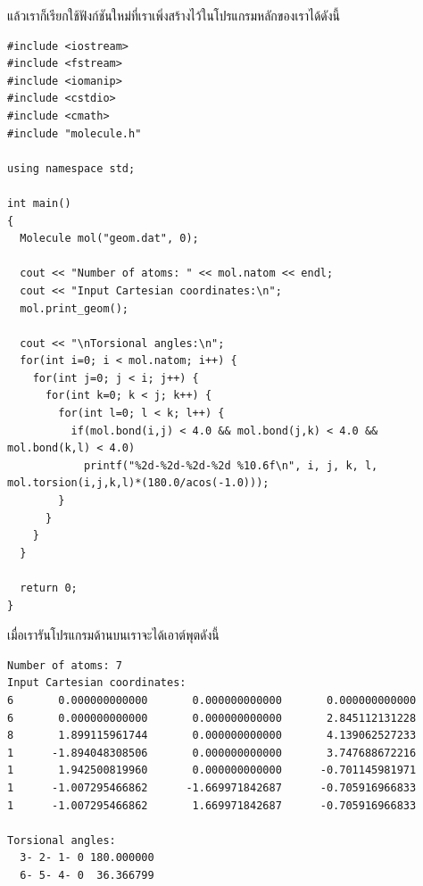 \vspace{5pt}

แล้วเราก็เรียกใช้ฟังก์ชันใหม่ที่เราเพิ่งสร้างไว้ในโปรแกรมหลักของเราได้ดังนี้

\vspace{5pt}

\begin{lstlisting}[style=MyC++]
#include <iostream>
#include <fstream>
#include <iomanip>
#include <cstdio>
#include <cmath>
#include "molecule.h"

using namespace std;

int main()
{
  Molecule mol("geom.dat", 0);

  cout << "Number of atoms: " << mol.natom << endl;
  cout << "Input Cartesian coordinates:\n";
  mol.print_geom();

  cout << "\nTorsional angles:\n";
  for(int i=0; i < mol.natom; i++) {
    for(int j=0; j < i; j++) {
      for(int k=0; k < j; k++) {
        for(int l=0; l < k; l++) {
          if(mol.bond(i,j) < 4.0 && mol.bond(j,k) < 4.0 && mol.bond(k,l) < 4.0)
            printf("%2d-%2d-%2d-%2d %10.6f\n", i, j, k, l, mol.torsion(i,j,k,l)*(180.0/acos(-1.0)));
        }
      }
    }
  }

  return 0;
}
\end{lstlisting}

\vspace{5pt}

\noindent เมื่อเรารันโปรแกรมด้านบนเราจะได้เอาต์พุตดังนี้

\vspace{5pt}

\begin{lstlisting}[style=MyC++]
Number of atoms: 7
Input Cartesian coordinates:
6       0.000000000000       0.000000000000       0.000000000000
6       0.000000000000       0.000000000000       2.845112131228
8       1.899115961744       0.000000000000       4.139062527233
1      -1.894048308506       0.000000000000       3.747688672216
1       1.942500819960       0.000000000000      -0.701145981971
1      -1.007295466862      -1.669971842687      -0.705916966833
1      -1.007295466862       1.669971842687      -0.705916966833

Torsional angles:
  3- 2- 1- 0 180.000000
  6- 5- 4- 0  36.366799  
\end{lstlisting}

\vspace{5pt}

\noindent {}

